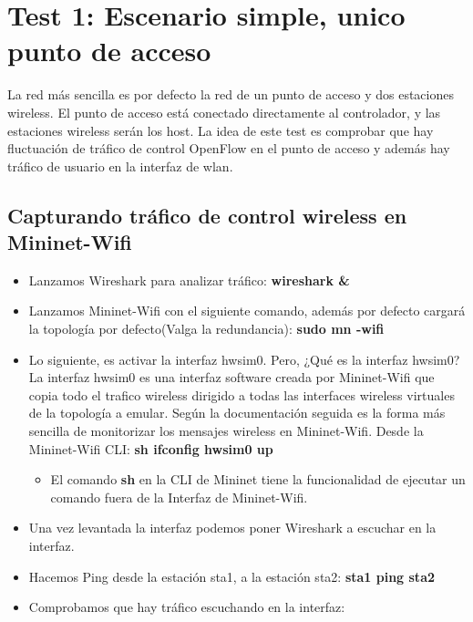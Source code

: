 \section{Test 1: Escenario simple, unico punto de acceso}
La red más sencilla es por defecto la red de un punto de acceso y dos estaciones wireless. El punto de acceso está conectado directamente al controlador, y las estaciones wireless serán los host. La idea de este test es comprobar que hay fluctuación de tráfico de control OpenFlow en el punto de acceso y además hay tráfico de usuario en la interfaz de wlan.
\subsection{Capturando tráfico de control wireless en Mininet-Wifi}
\begin{itemize}
    \item Lanzamos Wireshark para analizar tráfico: \textbf{wireshark \&}
    \item Lanzamos Mininet-Wifi con el siguiente comando, además por defecto cargará la topología por defecto(Valga la redundancia): \textbf{sudo mn -wifi}
    \item Lo siguiente, es activar la interfaz hwsim0. Pero, ¿Qué es la interfaz hwsim0? La interfaz hwsim0 es una interfaz software creada por Mininet-Wifi que copia todo el trafico wireless  dirigido a todas las interfaces wireless virtuales de la topología a emular. Según la documentación seguida es la forma más sencilla de monitorizar los mensajes wireless en Mininet-Wifi. Desde la Mininet-Wifi CLI: \textbf{sh ifconfig hwsim0 up} 
    \begin{itemize}
        \item El comando \textbf{sh} en la CLI de Mininet tiene la funcionalidad de ejecutar un comando fuera de la Interfaz de Mininet-Wifi.
    \end{itemize}
    
    \item Una vez levantada la interfaz podemos poner Wireshark a escuchar en la interfaz.
    
    \item Hacemos Ping desde la estación sta1, a la estación sta2: \textbf{sta1 ping sta2}
    
    \item Comprobamos que hay tráfico escuchando en la interfaz:
    
    
\end{itemize}
\newpage
